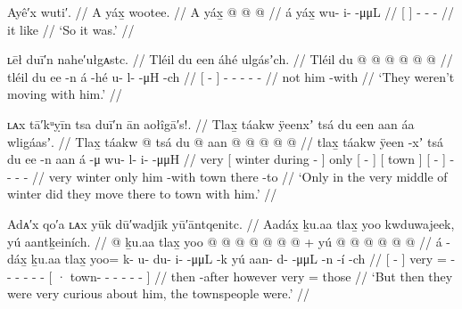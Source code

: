 \ex\label{ex:100-202-so-it-was}%
%
\begingl
	\glpreamble	Ayê′x wuti′. //
	\glpreamble	A yáx̱ wootee. //
	\gla	{} A yáx̱ {}
		 @ {} @ {} @ {} //
	\glb	{} á yáx̱ {}
		wu- i-  -μμL //
	\glc	{}[   {}]
		- -  - //
	\glb	{} it like {}
		 {} {} {} //
	\glft	‘So it was.’
		//
\endgl
\xe

\ex\label{ex:100-203-didnt-move}%
%
\begingl
	\glpreamble	ʟēł duī′n nahe′ułgᴀstc. //
	\glpreamble	Tléil du een áhé ulgásʼch. //
	\gla	Tléil {} du  @ {} {}  @ {}
		 @ {} @ {} @ {} @ {} //
	\glb	tléil {} du ee -n {} á -hé
		u- l-  -μH -ch //
	\glc	{} {}[   - {}]  -
		- -  - - //
	\gld	not {} him {} -with {}  {}
		 {} {} {} {} //
	\glft	‘They weren’t moving with him.’
		//
\endgl
\xe

\ex\label{ex:100-204-winter-moved}%
%
\begingl
	\glpreamble	ʟᴀx tā′kᵘỵīn tsa duī′n ān aołîgā′s!. //
	\glpreamble	Tlax̱ táakw ÿeenxʼ tsá du een aan áa wligáasʼ. //
	\gla	Tlax̱ {} táakw  @ {} {} tsá
		{} du  @ {} {}
		{} aan {}
		{}  @ {} {}
		 @ {} @ {} @ {} @ {} //
	\glb	tlax̱ {} táakw ÿeen -xʼ {} tsá
		{} du ee -n {}
		{} aan {}
		{} á -μ {}
		wu- l- i-  -μμH //
	\glc	very {}[ winter during - {}] only
		{}[   - {}]
		{}[ town {}]
		{}[  - {}]
		- - -  - //
	\gld	very {} winter  {} {} only
		{} him {} -with {}
		{} town {}
		{} there -to {}
		 {} {} {} {} //
	\glft	‘Only in the very middle of winter did they move there to town with him.’
		//
\endgl
\xe

\ex\label{ex:100-205-curious-townspeople}%
%
\begingl
	\glpreamble	Adᴀ′x qo′a ʟᴀx yūk dū′wadjīk yū′āntqenitc. //
	\glpreamble	Aadáx̱ ḵu.aa tlax̱ yoo kwduwajeek, yú aantḵeiních. //
	\gla	{}  @ {} {} ḵu.aa 
		tlax̱ yoo @  @ {} @ {} @ {} @ {} @ {} @ {} +
		{} yú  @ {} @ {} @ {} @ {} @ {} @ {} {} //
	\glb	{} á -dáx̱ {} ḵu.aa
		tlax̱ yoo= k- u- du- i-  -μμL -k
		{} yú aan- d-  -μμL -n -í -ch {} //
	\glc	{}[  - {}]  very
		= - - - -  - -
		{}[ · town- -  - - - - {}] //
	\gld	{} then -after {} however
		very =  {} {} {} {} {} {}
		{} those  {} {} {} {} {} {} {} //
	\glft	‘But then they were very curious about him, the townspeople were.’
		//
\endgl
\xe

